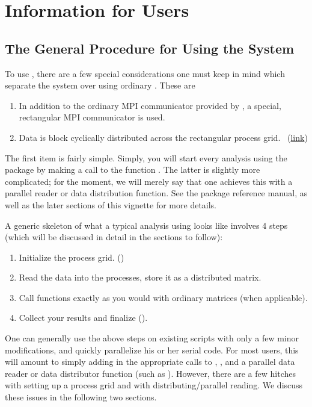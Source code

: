 \section{Information for Users}

\subsection{The General Procedure for Using the System}\label{sec:basic_steps}

To use , there are a few special considerations one must keep in mind which separate the system over using ordinary .  These are
\begin{enumerate}
 \item In addition to the ordinary MPI communicator provided by , a special, rectangular MPI communicator is used.~\citep{blug}
 \item Data is block cyclically distributed across the rectangular process grid.~\citep{slug} (\href{http://netlib.org/scalapack/slug/node75.html}{link})
\end{enumerate}

The first item is fairly simple.  Simply, you will start every analysis using the  package by making a call to the function .  The latter is slightly more complicated; for the moment, we will merely say that one achieves this with a parallel reader or data distribution function.  See the package reference manual, as well as the later sections of this vignette for more details.

A generic skeleton of what a typical analysis using  looks like involves 4 steps (which will be discussed in detail in the sections to follow):

\begin{enumerate}
\item Initialize the process grid. ()
\item Read the data into the processes, store it as a distributed matrix.
\item Call  functions exactly as you would with ordinary matrices (when applicable).
\item Collect your results and finalize ().
\end{enumerate}

One can generally use the above steps on existing  scripts with only a few minor modifications, and
quickly parallelize his or her serial code.   For most users, this will amount to simply adding in the appropriate calls to , , and a parallel data reader or data distributor function (such as ).  However, there are a few hitches with setting up a process grid and with distributing/parallel reading.  We discuss these issues in the following two sections.

